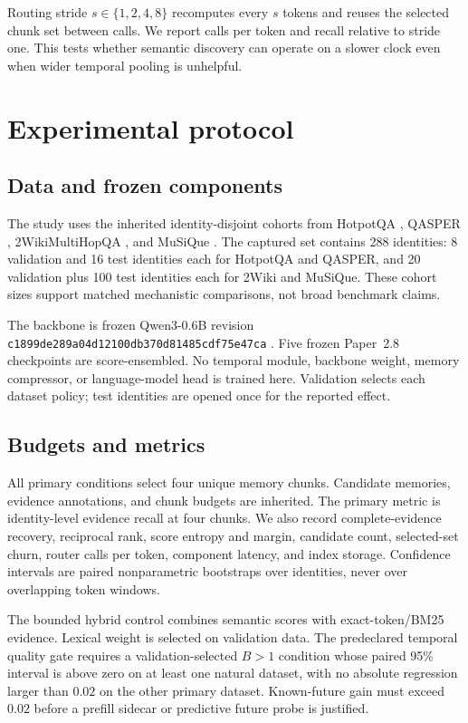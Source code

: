 \documentclass[11pt]{article}
\begin{document}
Routing stride $s\in\{1,2,4,8\}$ recomputes every $s$ tokens and reuses the selected chunk set between calls. We report calls per token and recall relative to stride one. This tests whether semantic discovery can operate on a slower clock even when wider temporal pooling is unhelpful.

\section{Experimental protocol}
\subsection{Data and frozen components}
The study uses the inherited identity-disjoint cohorts from HotpotQA \cite{yang2018hotpotqa}, QASPER \cite{dasigi2021qasper}, 2WikiMultiHopQA \cite{ho2020twowiki}, and MuSiQue \cite{trivedi2022musique}. The captured set contains 288 identities: 8 validation and 16 test identities each for HotpotQA and QASPER, and 20 validation plus 100 test identities each for 2Wiki and MuSiQue. These cohort sizes support matched mechanistic comparisons, not broad benchmark claims.

The backbone is frozen Qwen3-0.6B revision \texttt{c1899de289a04d12100db370d81485cdf75e47ca} \cite{qwen2025qwen3}. Five frozen Paper~2.8 checkpoints are score-ensembled. No temporal module, backbone weight, memory compressor, or language-model head is trained here. Validation selects each dataset policy; test identities are opened once for the reported effect.

\subsection{Budgets and metrics}
All primary conditions select four unique memory chunks. Candidate memories, evidence annotations, and chunk budgets are inherited. The primary metric is identity-level evidence recall at four chunks. We also record complete-evidence recovery, reciprocal rank, score entropy and margin, candidate count, selected-set churn, router calls per token, component latency, and index storage. Confidence intervals are paired nonparametric bootstraps over identities, never over overlapping token windows.

The bounded hybrid control combines semantic scores with exact-token/BM25 evidence. Lexical weight is selected on validation data. The predeclared temporal quality gate requires a validation-selected $B>1$ condition whose paired 95\% interval is above zero on at least one natural dataset, with no absolute regression larger than $0.02$ on the other primary dataset. Known-future gain must exceed $0.02$ before a prefill sidecar or predictive future probe is justified.
\end{document}
